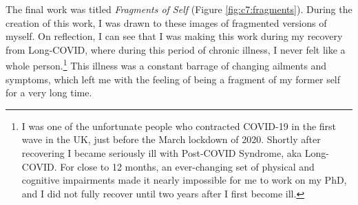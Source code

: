 The final work was titled \textit{Fragments of Self} \citeyearpar{broad2021fragments} (Figure \ref{fig:c7:fragments}). 
During the creation of this work, I was  drawn to these images of fragmented versions of myself. 
On reflection, I can see that I was making this work during my recovery from Long-COVID, where during this period of chronic illness, I never felt like a whole person.\footnote{
    I was one of the unfortunate people who contracted COVID-19 in the first wave in the UK, just before the March lockdown of 2020. 
    Shortly after recovering I became seriously ill with Post-COVID Syndrome, aka Long-COVID.
    For close to 12 months, an ever-changing set of physical and cognitive impairments made it nearly impossible for me to work on my PhD, and I did not fully recover until two years after I first become ill.
} 
This illness was a constant barrage of changing ailments and symptoms, which left me with the feeling of being a fragment of my former self for a very long time.

